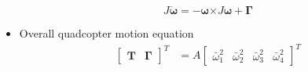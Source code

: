 \documentclass[10pt]{beamer}
\begin{document}
\begin{frame}
\begin{itemize}
\begin{equation}
			      J\boldsymbol{\Dot{\omega}}=-\boldsymbol{\omega} \boldsymbol{\times}J \boldsymbol{\omega}+\mathbf{\Gamma}
		      \end{equation}
			  \pause
			  \vspace*{-0.3 cm}
		\item Overall quadcopter motion equation
		      \begin{align}
			      \begin{bmatrix}
				      \mathbf{T} &
				      \mathbf{\Gamma}
			      \end{bmatrix}^T & =A\begin{bmatrix}
				      \bar{\omega}_{1}^{2} &
				      \bar{\omega}_{2}^{2} &
				      \bar{\omega}_{3}^{2} &
				      \bar{\omega}_{4}^{2}
			      \end{bmatrix}^T
		      \end{align}

	\end{itemize}

\end{frame}
\end{document}
